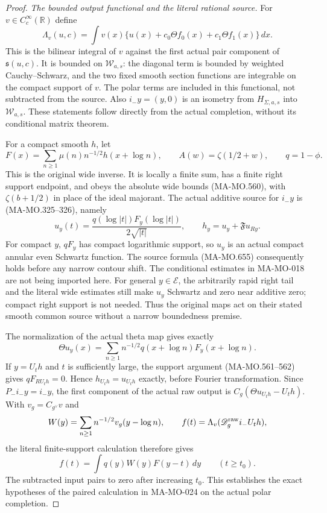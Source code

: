 \begin{proof}
\emph{The bounded output functional and the literal rational source.}
For \(v\in C_c^\infty(\mathbb R)\) define
\[
 \Lambda_v(u,c)=\int v(x)
       \{u(x)+c_0\Theta f_0(x)+c_1\Theta f_1(x)\}\,dx.
 \tag{MA-MO.653}
\]
This is the bilinear integral of \(v\) against the first actual
pair component of \(\mathfrak s(u,c)\). It is bounded on
\(\mathcal W_{a,s}\): the diagonal term is bounded by weighted
Cauchy--Schwarz, and the two fixed smooth section functions are
integrable on the compact support of \(v\). The polar terms
are included in this functional, not subtracted from the source.
Also \(i_-y=(y,0)\) is an isometry from \(H_{\Sigma,a,s}\)
into \(\mathcal W_{a,s}\). These statements follow directly
from the actual completion, without its conditional matrix theorem.

For a compact smooth \(h\), let
\[
 F(x)=\sum_{n\geq1}\mu(n)n^{-1/2}h(x+\log n),
 \qquad A(w)=\zeta(1/2+w),\qquad q=1-\phi.
 \tag{MA-MO.654}
\]
This is the original wide inverse. It is locally a finite sum,
has a finite right support endpoint, and obeys the absolute
wide bounds (MA-MO.560), with \(\zeta(b+1/2)\) in place of
the ideal majorant. The actual additive source for \(i_-y\)
is (MA-MO.325--326), namely
\[
 u_y(t)=\frac{q(\log|t|)F_y(\log|t|)}{2\sqrt{|t|}},
 \qquad h_y=u_y+\mathfrak F u_{Ry}.
 \tag{MA-MO.655}
\]
For compact \(y\), \(qF_y\) has compact logarithmic support,
so \(u_y\) is an actual compact annular even Schwartz function.
The source formula (MA-MO.655) consequently holds before any
narrow contour shift. The conditional estimates in MA-MO-018
are not being imported here. For general \(y\in\mathcal E\),
the arbitrarily rapid right tail and the literal wide estimates
still make \(u_y\) Schwartz and zero near additive zero;
compact right support is not needed. Thus the original maps
act on their stated smooth common source without a narrow
boundedness premise.

The normalization of the actual theta map gives exactly
\[
 \Theta u_y(x)=\sum_{n\geq1}n^{-1/2}
                   q(x+\log n)F_y(x+\log n).
 \tag{MA-MO.656}
\]
If \(y=U_th\) and \(t\) is sufficiently large, the support
argument (MA-MO.561--562) gives \(qF_{RU_th}=0\).
Hence \(h_{U_th}=u_{U_th}\) exactly, before Fourier
transformation. Since \(P_-i_-y=i_-y\), the first component
of the actual raw output is \(C_g(\Theta u_{U_th}-U_th)\).
With \(v_g=C_{g^\vee}v\) and
\[
 W(y)=\sum_{n\geq1}n^{-1/2}v_g(y-\log n),
 \qquad f(t)=\Lambda_v(\mathscr D_g^{\rm raw}i_-U_th),
\]
the literal finite-support calculation therefore gives
\[
                 f(t)=\int q(y)W(y)F(y-t)\,dy
                         \qquad(t\geq t_0).
 \tag{MA-MO.657}
\]
The subtracted input pairs to zero after increasing \(t_0\).
This establishes the exact hypotheses of the paired calculation
in MA-MO-024 on the actual polar completion.


\end{proof}
